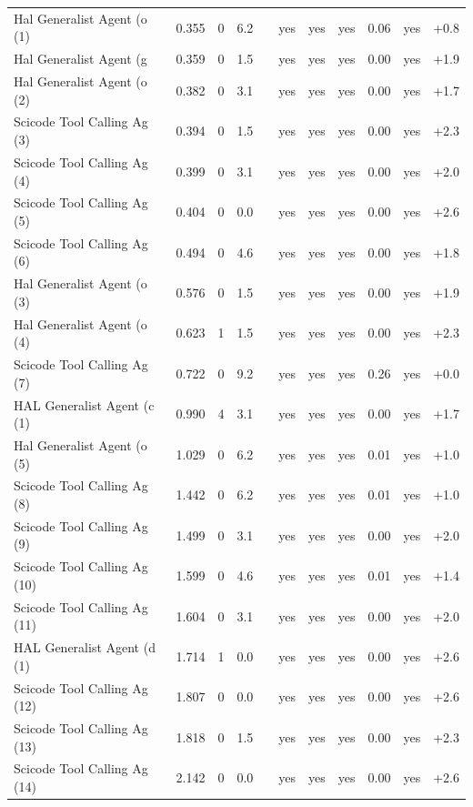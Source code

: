{\begin{longtable}{lrrrcccccrr}
Hal Generalist Agent (o~ (1) & 0.355 & 0 & 6.2 &  & yes & yes & yes & 0.06 & yes & +0.8 \\
Hal Generalist Agent (g~ & 0.359 & 0 & 1.5 &  & yes & yes & yes & 0.00 & yes & +1.9 \\
Hal Generalist Agent (o~ (2) & 0.382 & 0 & 3.1 &  & yes & yes & yes & 0.00 & yes & +1.7 \\
Scicode Tool Calling Ag~ (3) & 0.394 & 0 & 1.5 &  & yes & yes & yes & 0.00 & yes & +2.3 \\
Scicode Tool Calling Ag~ (4) & 0.399 & 0 & 3.1 &  & yes & yes & yes & 0.00 & yes & +2.0 \\
Scicode Tool Calling Ag~ (5) & 0.404 & 0 & 0.0 &  & yes & yes & yes & 0.00 & yes & +2.6 \\
Scicode Tool Calling Ag~ (6) & 0.494 & 0 & 4.6 &  & yes & yes & yes & 0.00 & yes & +1.8 \\
Hal Generalist Agent (o~ (3) & 0.576 & 0 & 1.5 &  & yes & yes & yes & 0.00 & yes & +1.9 \\
Hal Generalist Agent (o~ (4) & 0.623 & 1 & 1.5 &  & yes & yes & yes & 0.00 & yes & +2.3 \\
Scicode Tool Calling Ag~ (7) & 0.722 & 0 & 9.2 &  & yes & yes & yes & 0.26 & yes & +0.0 \\
HAL Generalist Agent (c~ (1) & 0.990 & 4 & 3.1 &  & yes & yes & yes & 0.00 & yes & +1.7 \\
Hal Generalist Agent (o~ (5) & 1.029 & 0 & 6.2 &  & yes & yes & yes & 0.01 & yes & +1.0 \\
Scicode Tool Calling Ag~ (8) & 1.442 & 0 & 6.2 &  & yes & yes & yes & 0.01 & yes & +1.0 \\
Scicode Tool Calling Ag~ (9) & 1.499 & 0 & 3.1 &  & yes & yes & yes & 0.00 & yes & +2.0 \\
Scicode Tool Calling Ag~ (10) & 1.599 & 0 & 4.6 &  & yes & yes & yes & 0.01 & yes & +1.4 \\
Scicode Tool Calling Ag~ (11) & 1.604 & 0 & 3.1 &  & yes & yes & yes & 0.00 & yes & +2.0 \\
HAL Generalist Agent (d~ (1) & 1.714 & 1 & 0.0 &  & yes & yes & yes & 0.00 & yes & +2.6 \\
Scicode Tool Calling Ag~ (12) & 1.807 & 0 & 0.0 &  & yes & yes & yes & 0.00 & yes & +2.6 \\
Scicode Tool Calling Ag~ (13) & 1.818 & 0 & 1.5 &  & yes & yes & yes & 0.00 & yes & +2.3 \\
Scicode Tool Calling Ag~ (14) & 2.142 & 0 & 0.0 &  & yes & yes & yes & 0.00 & yes & +2.6 \\

\end{longtable}}
